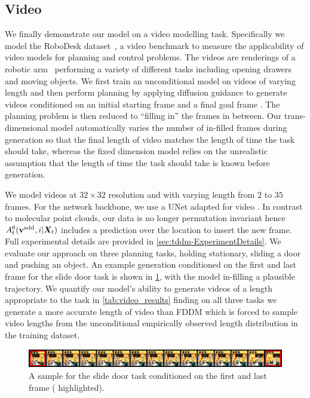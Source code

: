 \subsection{Video}

We finally demonstrate our model on a video modelling task. Specifically we model the RoboDesk dataset~\citep{tian2023control}, a video benchmark to measure the applicability of video models for planning and control problems. The videos are renderings of a robotic arm~\citep{kannan2021robodesk} performing a variety of different tasks including opening drawers and moving objects.
We first train an unconditional model on videos of varying length and then perform planning by applying diffusion guidance to generate videos conditioned on an initial starting frame and a final goal frame \cite{janner2022diffuser}. The planning problem is then reduced to ``filling in'' the frames in between. Our trans-dimensional model automatically varies the number of in-filled frames during generation so that the final length of video matches the length of time the task should take, whereas the fixed dimension model relies on the unrealistic assumption that the length of time the task should take is known before generation.

We model videos at $32 \times 32$ resolution and with varying length from $2$ to $35$ frames. For the network backbone, we use a UNet adapted for video \cite{harvey2022flexible}. In contrast to molecular point clouds, our data is no longer permutation invariant hence $A_t^\theta({\mathbf{v}}^{\textup{add}}, i | {\bm{X}}_t)$ includes a prediction over the location to insert the new frame. Full experimental details are provided in \cref{sec:tddm-ExperimentDetails}.
We evaluate our approach on three planning tasks, holding stationary, sliding a door and pushing an object. An example generation conditioned on the first and last frame for the slide door task is shown in \cref{fig:tddm-video_example}, with the model in-filling a plausible trajectory. We quantify our model's ability to generate videos of a length appropriate to the task in \cref{tab:video_results} finding on all three tasks we generate a more accurate length of video than FDDM which is forced to sample video lengths from the unconditional empirically observed length distribution in the training dataset.


\begin{figure}[t]
    \centering
    \includegraphics[width=\textwidth]{figs/tddm/21-1-padded_red_big.png}
    \caption{A sample for the slide door task conditioned on the first and last frame ({\color{red} highlighted}).}
    \label{fig:tddm-video_example}
\end{figure}

